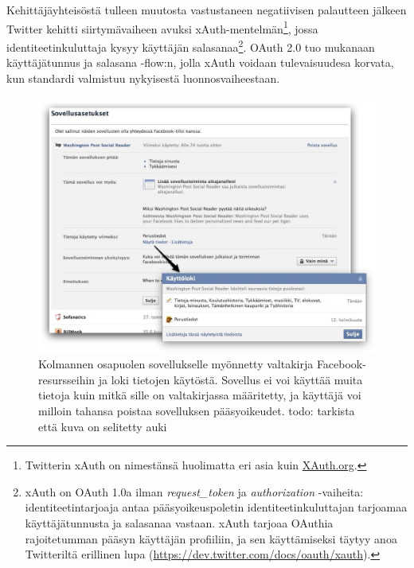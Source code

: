 \documentclass[finnish,gradu]{tktltiki}
\begin{document}
  Kehittäjäyhteisöstä tulleen muutosta vastustaneen negatiivisen palautteen jälkeen Twitter kehitti siirtymävaiheen avuksi xAuth-mentelmän\footnote{Twitterin xAuth on nimestänsä huolimatta eri asia kuin \url{XAuth.org}.}, jossa identiteetinkuluttaja kysyy käyttäjän salasanaa\footnote{xAuth on OAuth 1.0a ilman \emph{request\_token} ja \emph{authorization} -vaiheita: identiteetintarjoaja antaa pääsyoikeuspoletin identiteetinkuluttajan tarjoamaa käyttäjätunnusta ja salasanaa vastaan. xAuth tarjoaa OAuthia rajoitetumman pääsyn käyttäjän profiiliin, ja sen käyttämiseksi täytyy anoa Twitteriltä erillinen lupa (\url{https://dev.twitter.com/docs/oauth/xauth}).}. OAuth 2.0 tuo mukanaan käyttäjätunnus ja salasana -flow:n, jolla xAuth voidaan tulevaisuudesa korvata, kun standardi valmistuu nykyisestä luonnosvaiheestaan.


  \begin{figure}
    \centering
    \includegraphics[width=1.0\textwidth]{images/fb_app_acl.jpg}
    \caption{Kolmannen osapuolen sovellukselle myönnetty valtakirja Facebook-resursseihin ja loki tietojen käytöstä. Sovellus ei voi käyttää muita tietoja kuin mitkä sille on valtakirjassa määritetty, ja käyttäjä voi milloin tahansa poistaa sovelluksen pääsyoikeudet. todo: tarkista että kuva on selitetty auki}
    \label{fig:facebook_app_acl}
  \end{figure}
\end{document}
